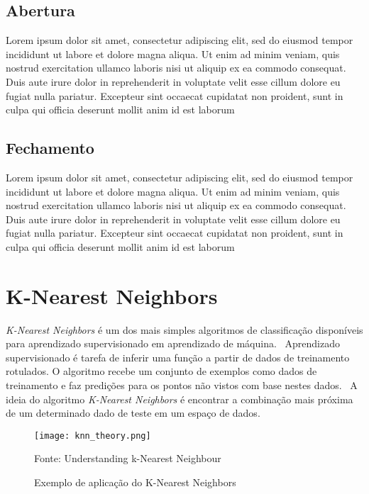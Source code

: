 \subsection{Abertura}
\label{sec:abertura}

Lorem ipsum dolor sit amet, consectetur adipiscing elit, sed do eiusmod tempor incididunt ut labore et dolore magna aliqua. Ut enim ad minim veniam, quis nostrud exercitation ullamco laboris nisi ut aliquip ex ea commodo consequat. Duis aute irure dolor in reprehenderit in voluptate velit esse cillum dolore eu fugiat nulla pariatur. Excepteur sint occaecat cupidatat non proident, sunt in culpa qui officia deserunt mollit anim id est laborum

\subsection{Fechamento}
\label{sec:fechamento}

Lorem ipsum dolor sit amet, consectetur adipiscing elit, sed do eiusmod tempor incididunt ut labore et dolore magna aliqua. Ut enim ad minim veniam, quis nostrud exercitation ullamco laboris nisi ut aliquip ex ea commodo consequat. Duis aute irure dolor in reprehenderit in voluptate velit esse cillum dolore eu fugiat nulla pariatur. Excepteur sint occaecat cupidatat non proident, sunt in culpa qui officia deserunt mollit anim id est laborum

\section{K-Nearest Neighbors}
\label{sec:knearest}

\emph{K-Nearest Neighbors} é um dos mais simples algoritmos de classificação disponíveis para aprendizado supervisionado em aprendizado de máquina.~\cite{opencv2014knearest} Aprendizado supervisionado é tarefa de inferir uma função a partir de dados de treinamento rotulados. O algoritmo recebe um conjunto de exemplos como dados de treinamento e faz predições para os pontos não vistos com base nestes dados.~\cite{mohri2012foundations} A ideia do algoritmo \emph{K-Nearest Neighbors} é encontrar a combinação mais próxima de um determinado dado de teste em um espaço de dados.~\cite{opencv2014knearest}

\begin{figure}[H]
	\centering
	\texttt{[image: knn\_theory.png]}
	\caption{Exemplo de aplicação do K-Nearest Neighbors}
Fonte: Understanding k-Nearest Neighbour~\cite{opencv2014knearest}
	\label{fig:knearest_example}
\end{figure}

